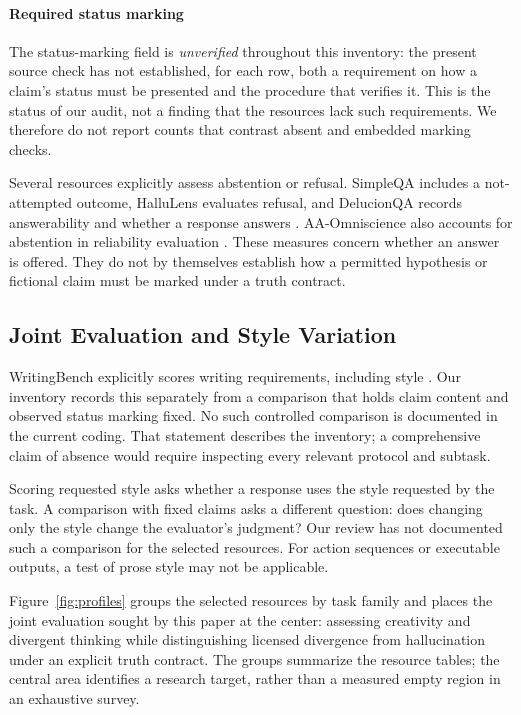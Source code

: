 \documentclass{clv2025}
\begin{document}
\paragraph{Required status marking}
The status-marking field is \emph{unverified} throughout this inventory:
the present source check has not established, for each row, both a
requirement on how a claim's status must be presented and the procedure
that verifies it. This is the status of our audit, not a finding that the
resources lack such requirements. We therefore do not report counts that
contrast absent and embedded marking checks.

Several resources explicitly assess abstention or refusal. SimpleQA
includes a not-attempted outcome, HalluLens evaluates refusal, and
DelucionQA records answerability and whether a response answers
\citep{wei_measuring_2024,bang_hallulens_2025,sadat_delucionqa_2023}.
AA-Omniscience also accounts for abstention in reliability evaluation
\citep{jackson_aaomniscience_2025}. These measures concern whether an answer
is offered. They do not by themselves establish how a permitted hypothesis
or fictional claim must be marked under a truth contract.

\subsection{Joint Evaluation and Style Variation}

WritingBench explicitly scores writing requirements, including style
\citep{wu_writingbench_2025}. Our inventory records this separately from a
comparison that holds claim content and observed status marking fixed.
No such controlled comparison is documented in the current coding. That
statement describes the inventory; a comprehensive claim of absence would
require inspecting every relevant protocol and subtask.

Scoring requested style asks whether a response uses the style requested
by the task. A comparison with fixed claims asks a different question:
does changing only the style change the evaluator's judgment? Our review
has not documented such a comparison for the selected resources. For action
sequences or executable outputs, a test of prose style may not be applicable.

Figure~\ref{fig:profiles} groups the selected resources by task family and
places the joint evaluation sought by this paper at the center: assessing
creativity and divergent thinking while distinguishing licensed divergence
from hallucination under an explicit truth contract. The groups summarize
the resource tables; the central area identifies a research target, rather
than a measured empty region in an exhaustive survey.
\end{document}
